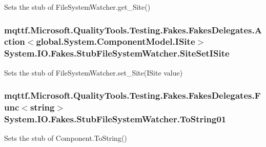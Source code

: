 Sets the stub of File\-System\-Watcher.\-get\-\_\-\-Site()

\hypertarget{class_system_1_1_i_o_1_1_fakes_1_1_stub_file_system_watcher_a270016728fabc4e6cc962cacd6c00d2f}{
\subsubsection[{Site\-Set\-I\-Site}]{\setlength{\rightskip}{0pt plus 5cm}mqttf.\-Microsoft.\-Quality\-Tools.\-Testing.\-Fakes.\-Fakes\-Delegates.\-Action$<$global.\-System.\-Component\-Model.\-I\-Site$>$ System.\-I\-O.\-Fakes.\-Stub\-File\-System\-Watcher.\-Site\-Set\-I\-Site}}\label{class_system_1_1_i_o_1_1_fakes_1_1_stub_file_system_watcher_a270016728fabc4e6cc962cacd6c00d2f}


Sets the stub of File\-System\-Watcher.\-set\-\_\-\-Site(\-I\-Site value)

\hypertarget{class_system_1_1_i_o_1_1_fakes_1_1_stub_file_system_watcher_a79c59ff1740a0e17adbdb13bbcfca071}{
\subsubsection[{To\-String01}]{\setlength{\rightskip}{0pt plus 5cm}mqttf.\-Microsoft.\-Quality\-Tools.\-Testing.\-Fakes.\-Fakes\-Delegates.\-Func$<$string$>$ System.\-I\-O.\-Fakes.\-Stub\-File\-System\-Watcher.\-To\-String01}}\label{class_system_1_1_i_o_1_1_fakes_1_1_stub_file_system_watcher_a79c59ff1740a0e17adbdb13bbcfca071}


Sets the stub of Component.\-To\-String()



